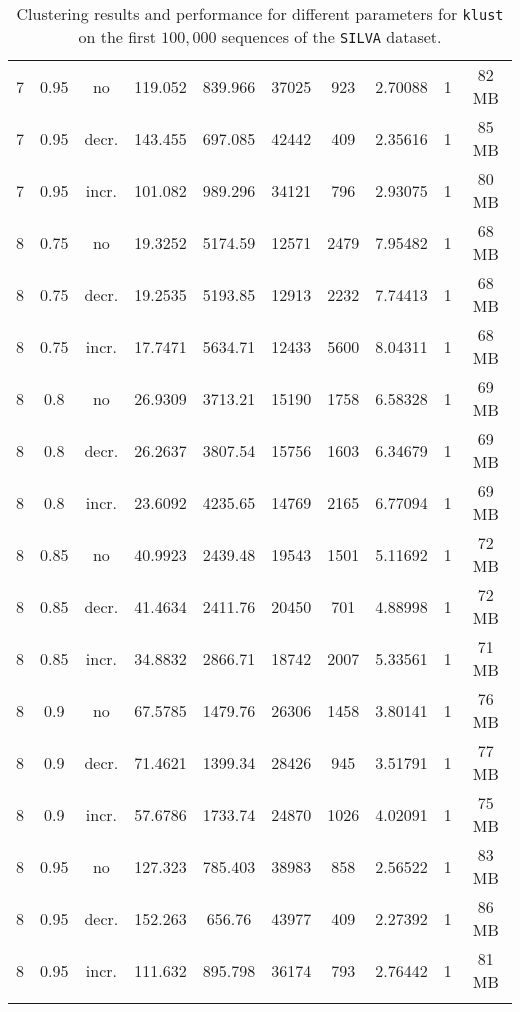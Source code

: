 \begin{longtable}{c|c|c|c|c|c|c|c|c|c}
  \hline
  7  &  0.95  & no    & 119.052  &  839.966 &  37025  &  923   &  2.70088  &  1  & 82  MB \\
  7  &  0.95  & decr. & 143.455  &  697.085 &  42442  &  409   &  2.35616  &  1  & 85  MB \\
  7  &  0.95  & incr. & 101.082  &  989.296 &  34121  &  796   &  2.93075  &  1  & 80  MB \\
  \hline
  8  &  0.75  & no    & 19.3252  &  5174.59 &  12571  &  2479  &  7.95482  &  1  & 68  MB \\
  8  &  0.75  & decr. & 19.2535  &  5193.85 &  12913  &  2232  &  7.74413  &  1  & 68  MB \\
  8  &  0.75  & incr. & 17.7471  &  5634.71 &  12433  &  5600  &  8.04311  &  1  & 68  MB \\
  \hline
  8  &  0.8   & no    & 26.9309  &  3713.21 &  15190  &  1758  &  6.58328  &  1  & 69  MB \\
  8  &  0.8   & decr. & 26.2637  &  3807.54 &  15756  &  1603  &  6.34679  &  1  & 69  MB \\
  8  &  0.8   & incr. & 23.6092  &  4235.65 &  14769  &  2165  &  6.77094  &  1  & 69  MB \\
  \hline
  8  &  0.85  & no    & 40.9923  &  2439.48 &  19543  &  1501  &  5.11692  &  1  & 72  MB \\
  8  &  0.85  & decr. & 41.4634  &  2411.76 &  20450  &  701   &  4.88998  &  1  & 72  MB \\
  8  &  0.85  & incr. & 34.8832  &  2866.71 &  18742  &  2007  &  5.33561  &  1  & 71  MB \\
  \hline
  8  &  0.9   & no    & 67.5785  &  1479.76 &  26306  &  1458  &  3.80141  &  1  & 76  MB \\
  8  &  0.9   & decr. & 71.4621  &  1399.34 &  28426  &  945   &  3.51791  &  1  & 77  MB \\
  8  &  0.9   & incr. & 57.6786  &  1733.74 &  24870  &  1026  &  4.02091  &  1  & 75  MB \\
  \hline
  8  &  0.95  & no    & 127.323  &  785.403 &  38983  &  858   &  2.56522  &  1  & 83  MB \\
  8  &  0.95  & decr. & 152.263  &  656.76  &  43977  &  409   &  2.27392  &  1  & 86  MB \\
  8  &  0.95  & incr. & 111.632  &  895.798 &  36174  &  793   &  2.76442  &  1  & 81  MB \\
  \caption{Clustering results and performance for different parameters for
    \texttt{klust} on the first $100,000$ sequences of the \texttt{SILVA} dataset.}
  \label{fig:klust_results_params}
\end{longtable}
\endgroup


